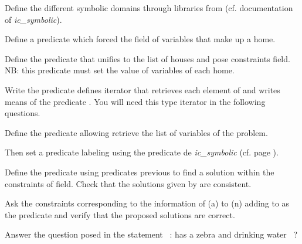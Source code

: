 \begin{question} 
  Define the different symbolic domains through
   libraries from \eclipse{} (cf. documentation of \emph{ic\_symbolic}).
\end{question}

\begin{question}
 Define a predicate  which forced the
   field of variables that make up a home.
\end{question}

\begin{question}
\label{numerotation}
Define the predicate  that unifies  to the
   list of houses and pose constraints
   field. NB: this predicate must set the value of variables  of each home.
\end{question}

\begin{question}
Write the predicate  defines
   iterator that retrieves each element of  and writes
   means of the predicate . You will need this type
   iterator in the following questions.
\end{question}

\begin{question}
 Define the predicate  allowing
   retrieve the list of variables of the problem.

 Then set a predicate labeling
   using the predicate
   de \emph{ic\_symbolic} (cf. page
  \pageref{intro:labeling}).
\end{question}

\begin{question}
 Define the predicate using predicates
   previous to find a solution within the constraints of
   field. Check that the solutions given by \eclipse{} are
   consistent.
\end{question}

\begin{question}
  Ask the constraints corresponding to the information of (a) to (n)
   adding to as the predicate  and 
   verify that the proposed solutions are correct.
\end{question}

\begin{question}\label{Puzzle_last}
Answer the question posed in the statement ~: has a zebra and
   drinking water ~?
\end{question}

